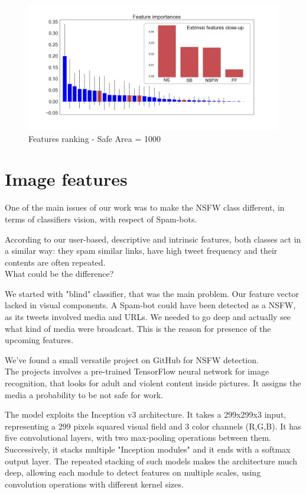 \begin{figure}[t!]
	\includegraphics[width=\columnwidth]{chapter4/figure/features_importances_1000.png}
	\caption{Features ranking - Safe Area = 1000}
	\label{fig:1000_overall}
\end{figure}


\section{Image features}
One of the main issues of our work was to make the NSFW class different, in terms of classifiers vision, with respect of Spam-bots.

According to our user-based, descriptive and intrinsic features, both classes act in a similar way: they spam similar links, have high tweet frequency and their contents are often repeated.\\
What could be the difference?

We started with "blind" classifier, that was the main problem. Our feature vector lacked in visual components. A Spam-bot could have been detected as a NSFW, as its tweets involved media and URLs. We needed to go deep and actually see what kind of media were broadcast.
This is the reason for presence of the upcoming features.

We've found a small versatile project on GitHub for NSFW detection.\\
The projects involves a pre-trained TensorFlow neural network for image recognition, that looks for adult and violent content inside pictures. It assigns the media a probability to be not safe for work.

The model exploits the Inception v3 \cite{inception} architecture.
It takes a 299x299x3 input, representing a 299 pixels squared visual field and 3 color channels (R,G,B). It has five convolutional layers, with two max-pooling operations between them. Successively, it stacks multiple "Inception modules" and it ends with a softmax output layer.
The repeated stacking of such models makes the architecture much deep, allowing each module to detect features on multiple scales, using convolution operations with different kernel sizes.


